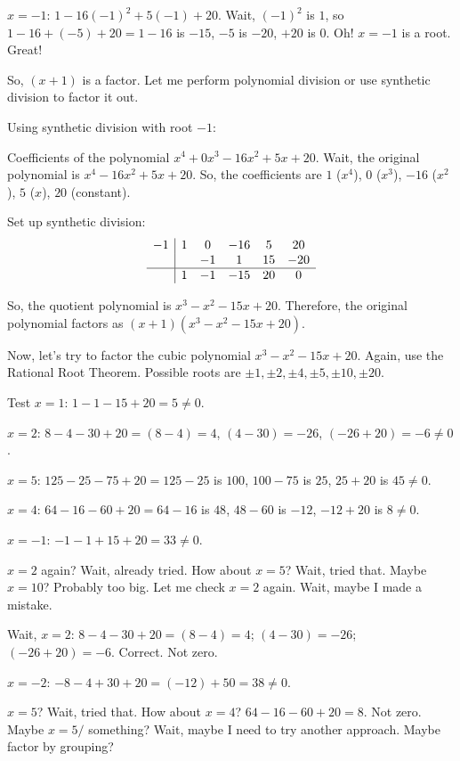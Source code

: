 \documentclass{article} %
\begin{document}
\begin{tcolorbox}[
  breakable,
  colback=gray!10,
  colframe=gray!60,
  title=Qwen3-8B often generates overly long responses,
  left=6pt,right=6pt,top=4pt,bottom=4pt,
  fontupper=\scriptsize
]
$x = -1$: $1 - 16(-1)^2 + 5(-1) + 20$. Wait, $(-1)^2$ is $1$, so $1 - 16 + (-5) + 20 = 1 - 16$ is $-15$, $-5$ is $-20$, $+20$ is $0$. Oh! $x = -1$ is a root. Great!

So, $(x + 1)$ is a factor. Let me perform polynomial division or use synthetic division to factor it out.

Using synthetic division with root $-1$:

Coefficients of the polynomial $x^4 + 0x^3 - 16x^2 + 5x + 20$. Wait, the original polynomial is $x^4 - 16x^2 + 5x + 20$. So, the coefficients are $1$ ($x^4$), $0$ ($x^3$), $-16$ ($x^2$), $5$ ($x$), $20$ (constant).

Set up synthetic division:
\[
\begin{array}{c|ccccc}
-1 & 1 & 0 & -16 & 5 & 20 \\
 & & -1 & 1 & 15 & -20 \\
\hline
 & 1 & -1 & -15 & 20 & 0
\end{array}
\]

So, the quotient polynomial is $x^3 - x^2 - 15x + 20$. Therefore, the original polynomial factors as $(x + 1)(x^3 - x^2 - 15x + 20)$.

Now, let's try to factor the cubic polynomial $x^3 - x^2 - 15x + 20$. Again, use the Rational Root Theorem. Possible roots are $\pm 1, \pm 2, \pm 4, \pm 5, \pm 10, \pm 20$.

Test $x = 1$: $1 - 1 - 15 + 20 = 5 \neq 0$.

$x = 2$: $8 - 4 - 30 + 20 = (8-4)=4$, $(4-30)= -26$, $(-26 + 20)= -6 \neq 0$.

$x = 5$: $125 - 25 - 75 + 20 = 125 - 25$ is $100$, $100 - 75$ is $25$, $25 + 20$ is $45 \neq 0$.

$x = 4$: $64 - 16 - 60 + 20 = 64 - 16$ is $48$, $48 - 60$ is $-12$, $-12 + 20$ is $8 \neq 0$.

$x = -1$: $-1 - 1 + 15 + 20 = 33 \neq 0$.

$x = 2$ again? Wait, already tried. How about $x = 5$? Wait, tried that. Maybe $x = 10$? Probably too big. Let me check $x = 2$ again. Wait, maybe I made a mistake.

Wait, $x=2$: $8 - 4 - 30 + 20 = (8 - 4) = 4$; $(4 - 30) = -26$; $(-26 + 20) = -6$. Correct. Not zero.

$x= -2$: $-8 - 4 + 30 + 20 = (-12) + 50 = 38 \neq 0$.

$x= 5$? Wait, tried that. How about $x= 4$? $64 - 16 - 60 + 20 = 8$. Not zero. Maybe $x= 5/ $ something? Wait, maybe I need to try another approach. Maybe factor by grouping?


\end{tcolorbox}
\end{document}
